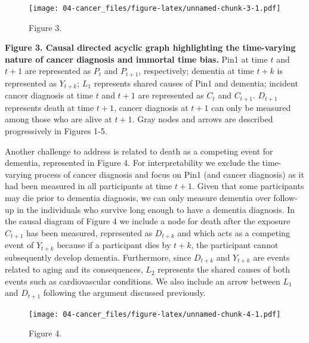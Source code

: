 \documentclass[
]{book}
\begin{document}
\begin{figure}
\centering
\texttt{[image: 04-cancer\_files/figure-latex/unnamed-chunk-3-1.pdf]}
\caption{\label{fig:unnamed-chunk-3}Figure 3.}
\end{figure}

\textbf{Figure 3. Causal directed acyclic graph highlighting the time-varying nature of cancer diagnosis and immortal time bias.} Pin1 at time \(t\) and \(t+1\) are represented as \(P_t\) and \(P_{t+1}\), respectively; dementia at time \(t+k\) is represented as \(Y_{t+k}\); \(L_1\) represents shared causes of Pin1 and dementia; incident cancer diagnosis at time \(t\) and \(t+1\) are represented as \(C_t\) and \(C_{t+1}\). \(D_{t+1}\) represents death at time \(t+1\), cancer diagnosis at \(t+1\) can only be measured among those who are alive at \(t+1\). Gray nodes and arrows are described progressively in Figures 1-5.

Another challenge to address is related to death as a competing event for dementia, represented in Figure 4. For interpretability we exclude the time-varying process of cancer diagnosis and focus on Pin1 (and cancer diagnosis) as it had been measured in all participants at time \(t+1\). Given that some participants may die prior to dementia diagnosis, we can only measure dementia over follow-up in the individuals who survive long enough to have a dementia diagnosis. In the causal diagram of Figure 4 we include a node for death after the exposure \(C_{t+1}\) has been measured, represented as \(D_{t+k}\) and which acts as a competing event of \(Y_{t+k}\) because if a participant dies by \(t + k\), the participant cannot subsequently develop dementia. Furthermore, since \(D_{t+k}\) and \(Y_{t+k}\) are events related to aging and its consequences, \(L_2\) represents the shared causes of both events such as cardiovascular conditions. We also include an arrow between \(L_1\) and \(D_{t+1}\) following the argument discussed previously.

\begin{figure}
\centering
\texttt{[image: 04-cancer\_files/figure-latex/unnamed-chunk-4-1.pdf]}
\caption{\label{fig:unnamed-chunk-4}Figure 4.}
\end{figure}
\end{document}

